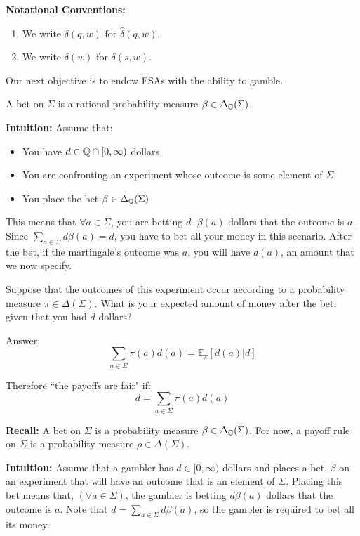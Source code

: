 \documentclass[../main.tex]{subfiles}
\begin{document}
\textbf{Notational Conventions:}
\begin{enumerate}
    \item We write $\delta(q, w)$ for $\hat{\delta}(q, w)$.
    \item We write $\delta(w)$ for $\delta(s, w)$.
\end{enumerate}

Our next objective is to endow FSAs with the ability to gamble.

\begin{defn}
A bet on $\Sigma$ is a rational probability measure $\beta \in \Delta_{\mathbb{Q}}(\Sigma)$.
\end{defn}

\textbf{Intuition:}
Assume that:
\begin{itemize}
    \item You have $d \in \mathbb{Q} \cap [0, \infty)$ dollars
    \item You are confronting an experiment whose outcome is some element of $\Sigma$
    \item You place the bet $\beta \in \Delta_{\mathbb{Q}}(\Sigma)$
\end{itemize}

This means that $\forall a \in \Sigma$, you are betting $d\cdot\beta(a)$ dollars
that the outcome is $a$. Since $\sum_{a \in \Sigma} d\beta(a) = d$, you have to
bet all your money in this scenario. After the bet, if the martingale's outcome
was $a$, you will have $d(a)$, an amount that we now specify.

Suppose that the outcomes of this experiment occur according to a probability
measure $\pi \in \Delta(\Sigma)$. What is your expected amount of money after
the bet, given that you had $d$ dollars? 

Answer:
\begin{equation*}
    \sum_{a \in \Sigma} \pi(a)d(a) = \mathbb{E}_{\pi}[d(a) | d]
\end{equation*}

Therefore ``the payoffs are fair" if:
\begin{equation*}
    d = \sum_{a \in \Sigma} \pi(a)d(a)
\end{equation*}

\textbf{Recall:}
A bet on $\Sigma$ is a probability measure $\beta \in \Delta_{\mathbb{Q}}(\Sigma)$.
For now, a payoff rule on $\Sigma$ is a probability measure $\rho \in \Delta(\Sigma)$.

\textbf{Intuition:}
    Assume that a gambler has $d \in [0, \infty)$ dollars and places a bet, 
$\beta$ on an experiment that will have an outcome that is an element of $\Sigma$.
Placing this bet means that, $(\forall a \in \Sigma)$, the gambler is betting
$d\beta(a)$ dollars that the outcome is $a$. Note that $d = \sum_{a \in \Sigma} d\beta(a)$,
so the gambler is required to bet all its money. 
\end{document}
